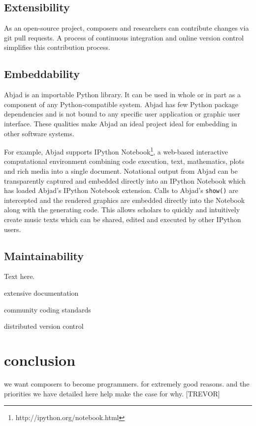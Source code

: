 \documentclass{article}
\begin{document}
\subsection{Extensibility}

As an open-source project, composers and researchers can contribute changes via
git pull requests. A process of continuous integration and online version
control simplifies this contribution process.

\subsection{Embeddability}

Abjad is an importable Python library. It can be used in whole or in part as a
component of any Python-compatible system. Abjad has few Python package
dependencies and is not bound to any specific user application or graphic user
interface. These qualities make Abjad an ideal project ideal for embedding in
other software systems.

For example, Abjad supports IPython
Notebook\footnote{http://ipython.org/notebook.html}, a web-based interactive
computational environment combining code execution, text, mathematics, plots
and rich media into a single document. Notational output from Abjad can be
transparently captured and embedded directly into an IPython Notebook which has
loaded Abjad's IPython Notebook extension. Calls to Abjad's \texttt{show()} are
intercepted and the rendered graphics are embedded directly into the Notebook
along with the generating code. This allows scholars to quickly and intuitively
create music texts which can be shared, edited and executed by other IPython
users.

\subsection{Maintainability}

Text here.

extensive documentation

community coding standards

distributed version control

\section{conclusion} \label{sec:conclusion}

we want composers to become programmers. for extremely good reasons. and the
priorities we have detailed here help make the case for why. [TREVOR]


\end{document}
